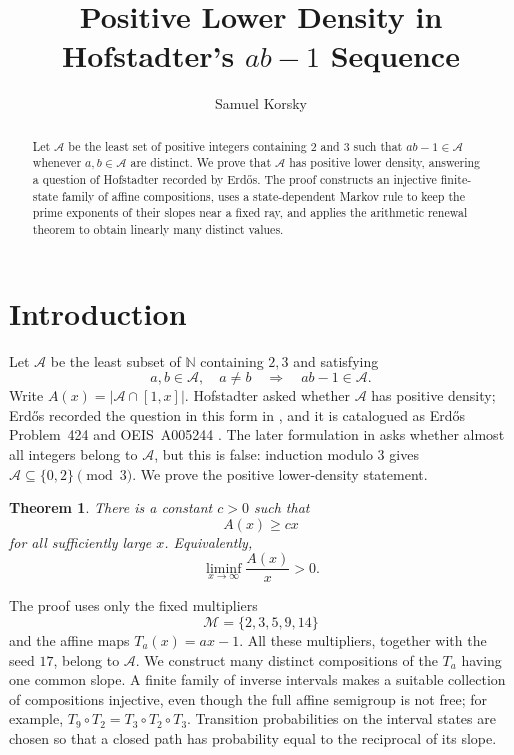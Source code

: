\documentclass[11pt,a4paper]{amsart}
\title{Positive Lower Density in Hofstadter's \texorpdfstring{$ab-1$}{ab-1} Sequence}
\author{Samuel Korsky}
\date{}
\newtheorem{theorem}{Theorem}[section]
\newcommand{\A}{\mathcal A}
\newcommand{\M}{\mathcal M}
\newcommand{\N}{\mathbb N}
\newcommand{\abs}[1]{\lvert #1\rvert}
\begin{document}
\begin{abstract}
Let $\A$ be the least set of positive integers containing $2$ and $3$ such that $ab-1\in\A$ whenever $a,b\in\A$ are distinct. We prove that $\A$ has positive lower density, answering a question of Hofstadter recorded by Erd\H{o}s. The proof constructs an injective finite-state family of affine compositions, uses a state-dependent Markov rule to keep the prime exponents of their slopes near a fixed ray, and applies the arithmetic renewal theorem to obtain linearly many distinct values.
\end{abstract}

\maketitle

\section{Introduction}

Let $\A$ be the least subset of $\N$ containing $2,3$ and satisfying
\[
 a,b\in\A,\quad a\ne b \quad\Longrightarrow\quad ab-1\in\A.
\]
Write $A(x)=\abs{\A\cap[1,x]}$. Hofstadter asked whether $\A$ has positive density; Erd\H{o}s recorded the question in this form in \cite{Erdos1977}, and it is catalogued as Erd\H{o}s Problem~424 and OEIS~A005244 \cite{Bloom424,OEIS}. The later formulation in \cite{ErdosGraham1980} asks whether almost all integers belong to $\A$, but this is false: induction modulo $3$ gives $\A\subseteq\{0,2\}\pmod 3$. We prove the positive lower-density statement.

\begin{theorem}\label{thm:main}
There is a constant $c>0$ such that
\[
 A(x)\ge cx
\]
for all sufficiently large $x$. Equivalently,
\[
 \liminf_{x\to\infty}\frac{A(x)}x>0.
\]
\end{theorem}

The proof uses only the fixed multipliers
\[
 \M=\{2,3,5,9,14\}
\]
and the affine maps $T_a(x)=ax-1$. All these multipliers, together with the seed $17$, belong to $\A$. We construct many distinct compositions of the $T_a$ having one common slope. A finite family of inverse intervals makes a suitable collection of compositions injective, even though the full affine semigroup is not free; for example, $T_9\circ T_2=T_3\circ T_2\circ T_3$. Transition probabilities on the interval states are chosen so that a closed path has probability equal to the reciprocal of its slope.
\end{document}
